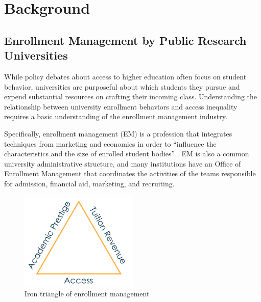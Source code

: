 \documentclass{article}
\begin{document}
\section*{Background}
\subsection*{Enrollment Management by Public Research Universities}

While policy debates about access to higher education often focus on student behavior, universities are purposeful about which students they pursue and expend substantial resources on crafting their incoming class. Understanding the relationship between university enrollment behaviors and access inequality requires a basic understanding of the enrollment management industry. 

Specifically, enrollment management (EM) is a profession that integrates techniques from marketing and economics in order to ``influence the characteristics and the size of enrolled student bodies'' \citep{RN2771}. EM is also a common university administrative structure, and many institutions have an Office of Enrollment Management that coordinates the activities of the teams responsible for admission, financial aid, marketing, and recruiting.

\begin{figure}[!t]
    \centering
    \includegraphics[width=0.5\textwidth]{assets/images/iron_triangle.png}
    \caption{Iron triangle of enrollment management}
    \label{fig:iron_triangle}
\end{figure}
\end{document}
